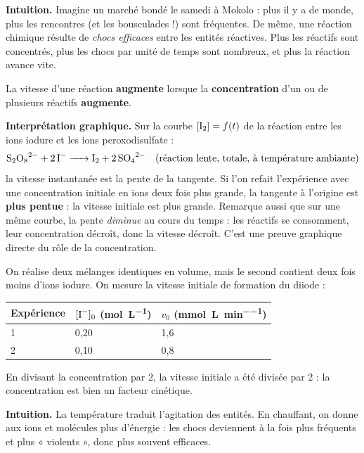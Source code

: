 \documentclass[11pt]{article}
\newcounter{popsec}
\newcounter{popsub}
\newcommand{\courssub}[1]{%
  \stepcounter{popsub}%
  \par\vspace{9pt}\noindent{\popxbold\fontsize{11.5}{13}\selectfont\color{popink}{\color{poporange}\thepopsec.\thepopsub}\hspace{6pt}#1}\par\nopagebreak\vspace{4pt}
}
\begin{document}
\textbf{Intuition.} Imagine un marché bondé le samedi à Mokolo : plus il y a de monde, plus les rencontres (et les bousculades !) sont fréquentes. De même, une réaction chimique résulte de \emph{chocs efficaces} entre les entités réactives. Plus les réactifs sont concentrés, plus les chocs par unité de temps sont nombreux, et plus la réaction avance vite.

\begin{propriete}
La vitesse d'une réaction \textbf{augmente} lorsque la \textbf{concentration} d'un ou de plusieurs réactifs \textbf{augmente}.
\end{propriete}

\textbf{Interprétation graphique.} Sur la courbe $[\ce{I2}] = f(t)$ de la réaction entre les ions iodure et les ions peroxodisulfate :
\[ \ce{S2O8^{2-} + 2 I- -> I2 + 2 SO4^{2-}} \quad \text{(réaction lente, totale, à température ambiante)} \]
la vitesse instantanée est la pente de la tangente. Si l'on refait l'expérience avec une concentration initiale en ions  deux fois plus grande, la tangente à l'origine est \textbf{plus pentue} : la vitesse initiale est plus grande. Remarque aussi que sur une même courbe, la pente \emph{diminue} au cours du temps : les réactifs se consomment, leur concentration décroît, donc la vitesse décroît. C'est une preuve graphique directe du rôle de la concentration.

\begin{exemplebox}
On réalise deux mélanges identiques en volume, mais le second contient deux fois moins d'ions iodure. On mesure la vitesse initiale de formation du diiode :
\begin{center}
\begin{tabularx}{\linewidth}{|l|X|X|}
\hline
\rowcolor{popblueL} Expérience & $[\ce{I-}]_0$ (\si{\mol\per\liter}) & $v_0$ (\si{\milli\mol\per\liter\per\minute}) \\
\hline
1 & 0,20 & 1,6 \\
\hline
2 & 0,10 & 0,8 \\
\hline
\end{tabularx}
\end{center}
En divisant la concentration par 2, la vitesse initiale a été divisée par 2 : la concentration est bien un facteur cinétique.
\end{exemplebox}

\courssub{Influence de la température}

\textbf{Intuition.} La température traduit l'agitation des entités. En chauffant, on donne aux ions et molécules plus d'énergie : les chocs deviennent à la fois plus fréquents et plus « violents », donc plus souvent efficaces.
\end{document}
